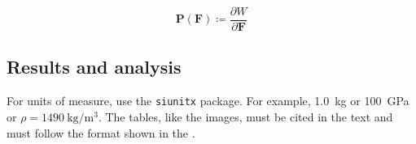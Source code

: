         \begin{equation}\label{eq:PK1}
            \bm{P}(\bm{F}) \coloneqq \frac{\partial W}{\partial \bm{F}}
        \end{equation}

\subsection{Results and analysis}
    For units of measure, use the \verb|siunitx| package. For example, \qty{1.0}{\kilogram} or \qty{100}{\giga\pascal} or $\rho = \qty{1490}{\kilogram\per\meter\cubed}$.
    The tables, like the images, must be cited in the text and must follow the format shown in the .

